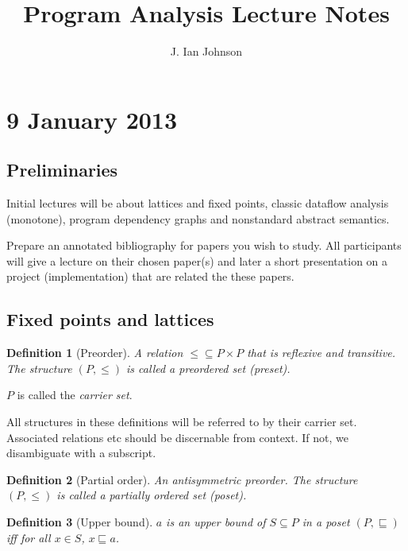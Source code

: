 \documentclass[11pt]{article}
\author{J. Ian Johnson}
\title{Program Analysis Lecture Notes}
\newtheorem{definition}{Definition}
\begin{document}
\maketitle
\section{9 January 2013}

\subsection{Preliminaries}
Initial lectures will be about lattices and fixed points, classic
dataflow analysis (monotone), program dependency graphs and
nonstandard abstract semantics.

Prepare an annotated bibliography for papers you wish to study. All
participants will give a lecture on their chosen paper(s) and later a
short presentation on a project (implementation) that are related the these papers.


\subsection{Fixed points and lattices}

\begin{definition}[Preorder]
A relation $\le \subseteq P\times P$ that is reflexive and
transitive. The structure $(P,\le)$ is called a preordered set (preset).
\end{definition}
$P$ is called the \emph{carrier set}.

All structures in these definitions will be referred to by their
carrier set. Associated relations etc should be discernable from
context. If not, we disambiguate with a subscript.

\begin{definition}[Partial order]
An antisymmetric preorder. The structure $(P, \le)$ is called a partially ordered set (poset).
\end{definition}

\begin{definition}[Upper bound]
$a$ is an upper bound of $S \subseteq P$ in a poset
  $(P, \sqsubseteq)$ iff for all $x \in S$, $x \sqsubseteq a$.
\end{definition}
\end{document}
